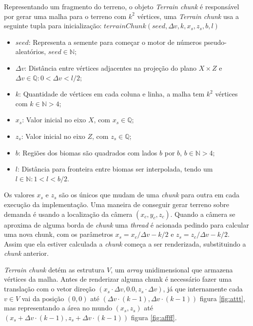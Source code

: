 Representando um fragmento do terreno, o objeto \textit{Terrain chunk} é responsável
por gerar uma malha para o terreno com $k^2$ vértices, uma \textit{Terrain chunk} usa
a seguinte tupla para inicialização: 
$terrainChunk(seed, \Delta{v}, k, x_{s}, z_{s}, b, l)$
\begin{itemize}
    \item $seed$: Representa a semente para começar o motor de números
    pseudo-aleatórios, $seed \in \mathbb{N}$;
    \item $\Delta{v}$: Distância entre vértices adjacentes na
    projeção do plano $X \times Z$ e $\Delta{v} \in \mathbb{Q}:0 < \Delta{v} < l/2$;
    \item $k$: Quantidade de vértices em cada coluna e 
    linha, a malha tem $k^2$ vértices com $k \in \mathbb{N}>4$;
    \item $x_{s}$: Valor inicial no eixo $X$, com $x_{s} \in \mathbb{Q}$;
    \item $z_{s}$: Valor inicial no eixo $Z$, com $z_{s} \in \mathbb{Q}$;
    \item $b$: Regiões dos biomas são quadrados com lados $b$ por $b$, $b \in \mathbb{N}>4$;
    \item $l$: Distância para fronteira entre biomas ser interpolada, tendo um $l \in \mathbb{N}:1 < l < b/2$.
\end{itemize}


Os valores $x_{s}$ e $z_{s}$ são os únicos 
que mudam de uma \textit{chunk} para outra em cada execução da implementação.
Uma maneira de conseguir gerar terreno sobre demanda
é usando a localização da câmera $(x_{c}, y_{c}, z_{c})$. Quando a câmera se
aproxima de alguma borda de \textit{chunk} 
uma \textit{thread} é acionada pedindo para calcular uma nova chunk, com os parâmetros
$x_{s} = x_{c}/\Delta{v} - k/2$ e $z_{s} = z_{c}/\Delta{v} - k/2$. Assim que ela
estiver calculada a \textit{chunk} começa a ser renderizada, substituindo a \textit{chunk} anterior.

\textit{Terrain chunk} detém as estrutura $V$, um \textit{array} unidimensional que armazena
vértices da malha.
Antes de renderizar alguma chunk é necessário fazer uma translação com o vetor direção 
$(x_{s} \cdot \Delta{v}, 0.0, z_{s} \cdot \Delta{v})$, já que internamente cada $v \in V$ vai 
da posição $(0, 0)$ até $(\Delta{v} \cdot (k-1), \Delta{v} \cdot (k-1))$ figura \ref{fig:attt}, mas representando a área 
no mundo $(x_{s}, z_{s})$ até $(x_{s} + \Delta{v} \cdot (k-1), z_{s} + \Delta{v} \cdot (k-1))$ figura \ref{fig:affff}.

